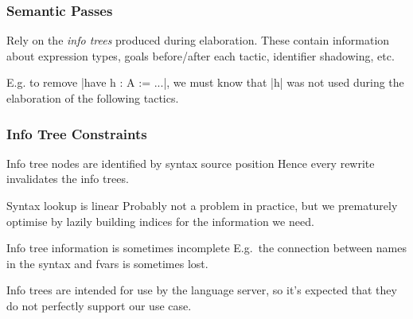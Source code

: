 \begin{frame}
  \frametitle{Semantic Passes}

  Rely on the \emph{info trees} produced during elaboration.
  These contain information about expression types, goals before/after each tactic, identifier shadowing, etc.

  \pause

  E.g. to remove \lean|have h : A := ...|, we must know that \lean|h| was not used during the elaboration of the following tactics.
\end{frame}

\begin{frame}
  \frametitle{Info Tree Constraints}

  \begin{block}{Info tree nodes are identified by syntax source position}
    Hence every rewrite invalidates the info trees.
  \end{block}

  \pause

  \begin{block}{Syntax lookup is linear}
    Probably not a problem in practice, but we prematurely optimise by lazily building indices for the information we need.
  \end{block}

  \pause

  \begin{block}{Info tree information is sometimes incomplete}
    E.g.\ the connection between names in the syntax and fvars is sometimes lost.
  \end{block}

  \pause

  Info trees are intended for use by the language server, so it's expected that they do not perfectly support our use case.
\end{frame}

